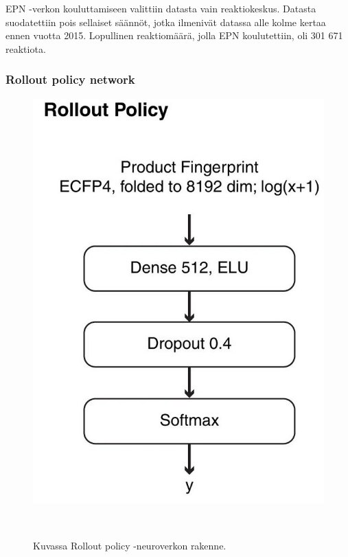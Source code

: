 \documentclass[finnish,twoside,censored,tkt,sw-line]{HYthesisML}
\begin{document}
EPN -verkon kouluttamiseen valittiin datasta vain reaktiokeskus.
Datasta suodatettiin pois sellaiset säännöt, jotka ilmenivät datassa alle kolme kertaa ennen vuotta 2015.
Lopullinen reaktiomäärä, jolla EPN koulutettiin, oli 301 671 reaktiota.

\subsubsection{Rollout policy network}

\begin{figure}[ht]
    \centering
    \includegraphics[]{rollout-policy.jpg}
    \caption{Kuvassa Rollout policy -neuroverkon rakenne.}
    {~\cite{SeglerMarwinHS2018Pcsw}}
\end{figure}

\end{document}
